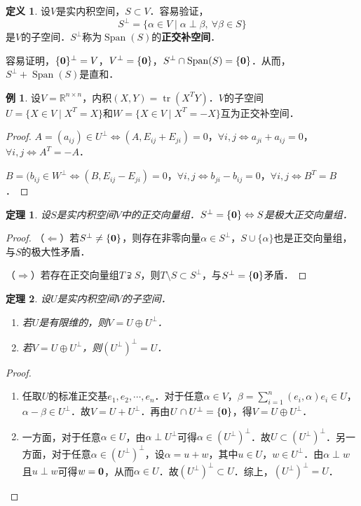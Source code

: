 \documentclass[a4paper,fontset=windows]{ctexbook}
\newtheorem{theorem}{定理}[chapter]
\theoremstyle{definition}
\newtheorem{definition}{定义}[chapter]
\newtheorem{example}{例}[chapter]
\DeclareMathOperator{\Span}{Span}
\DeclareMathOperator{\tr}{tr}
\begin{document}
\begin{definition}
设$V$是实内积空间，$S\subset V$．容易验证，
$$S^\perp=\{\alpha\in V\mid\alpha\perp\beta,~\forall\beta\in S\}$$
是$V$的子空间．$S^\perp$称为$\Span(S)$的{\bf 正交补空间}．
\end{definition}

容易证明，$\{{\bf 0}\}^\perp=V$，$V^\perp=\{{\bf 0}\}$，$S^\perp\cap\Span(S)=\{{\bf 0}\}$．从而，$S^\perp+\Span(S)$是直和．

\begin{example}
设$V=\mathbb{R}^{n\times n}$，内积$(X,Y)=\tr(X^TY)$．$V$的子空间$U=\{X\in V\mid X^T=X\}$和$W=\{X\in V\mid X^T=-X\}$互为正交补空间．
\end{example}

\begin{proof}
$A=(a_{ij})\in U^\perp\Leftrightarrow(A,E_{ij}+E_{ji})=0$，$\forall i,j\Leftrightarrow a_{ji}+a_{ij}=0$，$\forall i,j\Leftrightarrow A^T=-A$．

$B=(b_{ij}\in W^\perp\Leftrightarrow(B,E_{ij}-E_{ji})=0$，$\forall i,j\Leftrightarrow b_{ji}-b_{ij}=0$，$\forall i,j\Leftrightarrow B^T=B$．
\end{proof}

\begin{theorem}
设$S$是实内积空间$V$中的正交向量组．$S^\perp=\{{\bf 0}\}\Leftrightarrow S$是极大正交向量组．
\end{theorem}

\begin{proof}
（$\Leftarrow$）若$S^\perp\ne\{{\bf 0}\}$，则存在非零向量$\alpha\in S^\perp$，$S\cup\{\alpha\}$也是正交向量组，与$S$的极大性矛盾．

（$\Rightarrow$）若存在正交向量组$T\supsetneqq S$，则$T\setminus S\subset S^\perp$，与$S^\perp=\{{\bf 0}\}$矛盾．
\end{proof}

\begin{theorem}\label{thm10.6}
设$U$是实内积空间$V$的子空间．
\begin{enumerate}
\item 若$U$是有限维的，则$V=U\oplus U^\perp$．
\item 若$V=U\oplus U^\perp$，则$(U^\perp)^\perp=U$．
\end{enumerate}
\end{theorem}

\begin{proof}~
\begin{enumerate}
\item 任取$U$的标准正交基$e_1,e_2,\cdots,e_n$．对于任意$\alpha\in V$，$\beta=\sum\limits_{i=1}^n(e_i,\alpha)e_i\in U$，$\alpha-\beta\in U^\perp$．故$V=U+U^\perp$．再由$U\cap U^\perp=\{{\bf 0}\}$，得$V=U\oplus U^\perp$．

\item 一方面，对于任意$\alpha\in U$，由$\alpha\perp U^\perp$可得$\alpha\in(U^\perp)^\perp$．故$U\subset(U^\perp)^\perp$．另一方面，对于任意$\alpha\in(U^\perp)^\perp$，设$\alpha=u+w$，其中$u\in U$，$w\in U^\perp$．由$\alpha\perp w$且$u\perp w$可得$w={\bf 0}$，从而$\alpha\in U$．故$(U^\perp)^\perp\subset U$．综上，$(U^\perp)^\perp=U$．\qedhere
\end{enumerate}
\end{proof}
\end{document}
